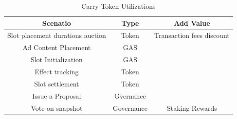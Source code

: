 \begin{table}[!htb]
    \centering
    \begin{tabular}{c|c|c}
        \toprule
        Scenatio & Type & Add Value \\
        \midrule
        \rule{0pt}{2ex} 
        Slot placement durations auction & Token &Transaction fees discount  \\
        \rule{0pt}{2ex} 
        Ad Content Placement & GAS &  \\
        \rule{0pt}{2ex} 
        Slot Initialization &GAS& \\
        \rule{0pt}{2ex} 
        Effect tracking & Token & \\
        \rule{0pt}{2ex} 
        Slot settlement  & Token & \\
        \rule{0pt}{2ex} 
        Issue a Proposal & Gvernance & \\
        \rule{0pt}{2ex} 
        Vote on snapshot & Governance & Staking Rewards\\
        \bottomrule
    \end{tabular}
    \caption{Carry Token Utilizations}
    \label{table:example}
\end{table}